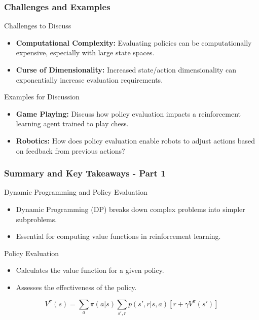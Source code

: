 \documentclass[aspectratio=169]{beamer}
\begin{document}
\begin{frame}[fragile]
    \frametitle{Challenges and Examples}
    \begin{block}{Challenges to Discuss}
        \begin{itemize}
            \item \textbf{Computational Complexity:} Evaluating policies can be computationally expensive, especially with large state spaces.
            \item \textbf{Curse of Dimensionality:} Increased state/action dimensionality can exponentially increase evaluation requirements.
        \end{itemize}
    \end{block}

    \begin{block}{Examples for Discussion}
        \begin{itemize}
            \item \textbf{Game Playing:} Discuss how policy evaluation impacts a reinforcement learning agent trained to play chess.
            \item \textbf{Robotics:} How does policy evaluation enable robots to adjust actions based on feedback from previous actions?
        \end{itemize}
    \end{block}
\end{frame}

\begin{frame}[fragile]
    \frametitle{Summary and Key Takeaways - Part 1}
    
    \begin{block}{Dynamic Programming and Policy Evaluation}
        \begin{itemize}
            \item Dynamic Programming (DP) breaks down complex problems into simpler subproblems.
            \item Essential for computing value functions in reinforcement learning.
        \end{itemize}
    \end{block}
    
    \begin{block}{Policy Evaluation}
        \begin{itemize}
            \item Calculates the value function for a given policy.
            \item Assesses the effectiveness of the policy.
        \end{itemize}
        \begin{equation}
            V^{\pi}(s) = \sum_{a} \pi(a|s) \sum_{s', r} p(s', r | s, a) \left[ r + \gamma V^{\pi}(s') \right]
        \end{equation}
    \end{block}
\end{frame}
\end{document}

